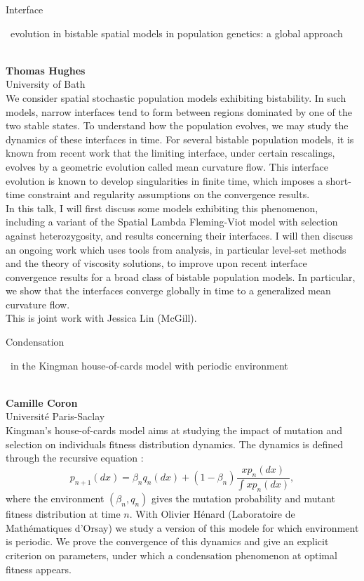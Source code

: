 \documentclass[12pt,a4paper]{article}
\newcommand{\ZAbst}{\rule[-1ex]{0pt}{2ex}\ } %
\begin{document}
\noindent
{\Large Interface\ZAbst evolution in bistable spatial models in population genetics: a global approach}\\[1ex]
{\large 
\textbf{Thomas Hughes} \\[1ex] University of Bath}\\[2ex]
We consider spatial stochastic population models exhibiting bistability. In such models, narrow interfaces tend to form between regions dominated by one of the two stable states. To understand how the population evolves, we may study the dynamics of these interfaces in time. For several bistable population models, it is known from recent work that the limiting interface, under certain rescalings, evolves by a geometric evolution called mean curvature flow. This interface evolution is known to develop singularities in finite time, which imposes a short-time constraint and regularity assumptions on the convergence results.
\\
In this talk, I will first discuss some models exhibiting this phenomenon, including a variant of the Spatial Lambda Fleming-Viot model with selection against heterozygosity, and results concerning their interfaces. I will then discuss an ongoing work which uses tools from analysis, in particular level-set methods and the theory of viscosity solutions, to improve upon recent interface convergence results for a broad class of bistable population models. In particular, we show that the interfaces converge globally in time to a generalized mean curvature flow. 
\\
This is joint work with Jessica Lin (McGill). 


\bigskip \bigskip

{\Large  
Condensation\ZAbst in the Kingman house-of-cards model with periodic environment}\\[1ex]
{\large 
 \textbf{Camille Coron}\\[1ex] Université Paris-Saclay}\\[2ex]

Kingman's house-of-cards model aims at studying the impact of mutation and selection on individuals fitness distribution dynamics. The dynamics is defined through the recursive equation : $$p_{n+1}(dx)=\beta_n q_n(dx) + (1-\beta_n)\frac{x p_n(dx)}{\int x p_n(dx)},$$ where the environment $(\beta_n,q_n)$ gives the mutation probability and mutant fitness distribution at time $n$. With Olivier Hénard (Laboratoire de Mathématiques d'Orsay) we study a version of this modele for which environment is periodic. We prove the convergence of this dynamics and give an explicit criterion on parameters, under which a condensation phenomenon at optimal fitness appears.
\end{document}
